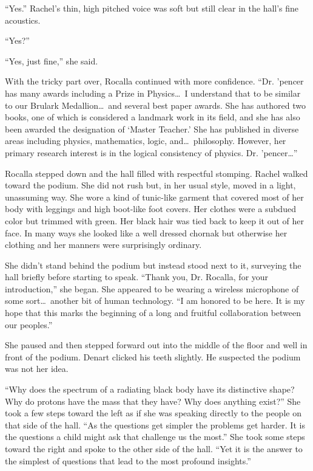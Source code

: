 ``Yes.'' Rachel's thin, high pitched voice was soft but still clear in the hall's fine
acoustics.

``Yes?''

``Yes, just fine,'' she said.

With the tricky part over, Rocalla continued with more confidence. ``Dr. 'pencer has many awards
including a  Prize in Physics\ldots\ I understand that to be similar to our Brulark
Medallion\ldots\ and several best paper awards. She has authored two books, one of which is
considered a landmark work in its field, and she has also been awarded the designation of
`Master Teacher.' She has published in diverse areas including physics, mathematics, logic,
and\ldots\ philosophy. However, her primary research interest is in the logical consistency of
physics. Dr. 'pencer\ldots''

Rocalla stepped down and the hall filled with respectful stomping. Rachel walked toward the
podium. She did not rush but, in her usual style, moved in a light, unassuming way. She wore a
kind of tunic-like garment that covered most of her body with leggings and high boot-like foot
covers. Her clothes were a subdued color but trimmed with green. Her black hair was tied back to
keep it out of her face. In many ways she looked like a well dressed chornak but otherwise her
clothing and her manners were surprisingly ordinary.

She didn't stand behind the podium but instead stood next to it, surveying the hall briefly
before starting to speak. ``Thank you, Dr. Rocalla, for your introduction,'' she began. She
appeared to be wearing a wireless microphone of some sort\ldots\ another bit of human
technology. ``I am honored to be here. It is my hope that this marks the beginning of a long and
fruitful collaboration between our peoples.''

She paused and then stepped forward out into the middle of the floor and well in front of the
podium. Denart clicked his teeth slightly. He suspected the podium was not her idea.

``Why does the spectrum of a radiating black body have its distinctive shape? Why do protons
have the mass that they have? Why does anything exist?'' She took a few steps toward the left as
if she was speaking directly to the people on that side of the hall. ``As the questions get
simpler the problems get harder. It is the questions a child might ask that challenge us the
most.'' She took some steps toward the right and spoke to the other side of the hall. ``Yet it
is the answer to the simplest of questions that lead to the most profound insights.''

